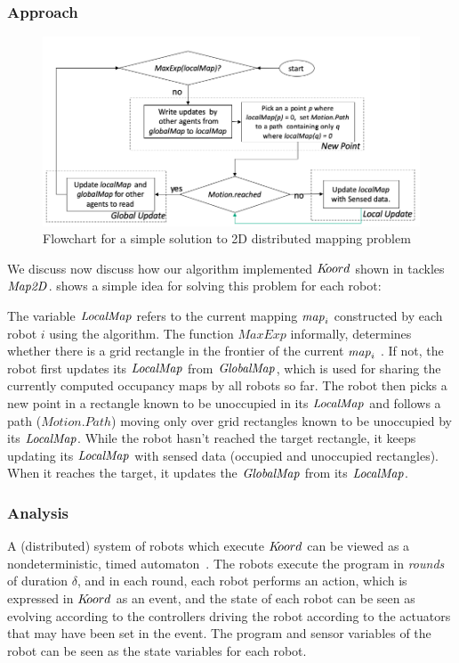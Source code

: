 \subsubsection{Approach}


\begin{figure}[!htbp]
    \centering
    \includegraphics[width=\linewidth]{figs/map_flowchart.png}
    \caption{Flowchart for a simple solution to 2D distributed mapping problem\vspace{-2mm}}
    \label{fig:flowmap}
\end{figure}



We discuss now discuss how our algorithm implemented $K\kern-2pt oord$ shown in  tackles $\mathit{Map2D}$.  shows a simple idea for solving this problem for each robot:

The variable $\mathit{LocalMap}$ refers to the current mapping $\mathit{map}_i$ constructed by each robot $i$ using the algorithm. The function $\mathit{MaxExp}$ informally, determines whether there is a grid rectangle in the frontier of the current $\mathit{map}_i$ . If not, the robot first updates its $\mathit{LocalMap}$ from $\mathit{GlobalMap}$, which is used for sharing the currently computed occupancy maps by all robots so far. The robot then picks a new point in a rectangle known to be unoccupied in its $\mathit{LocalMap}$ and follows a path ($\mathit{Motion.Path}$) moving only over grid rectangles known to be unoccupied by its $\mathit{LocalMap}$. While the robot hasn't reached the target rectangle, it keeps updating its $\mathit{LocalMap}$ with sensed data (occupied and unoccupied rectangles). When it reaches the target, it updates the $\mathit{GlobalMap}$ from its $\mathit{LocalMap}$.


\subsubsection{Analysis}
A (distributed) system of robots which execute $K\kern-2pt oord$ can be viewed as a nondeterministic, timed automaton~\cite{TIOAmon}. The robots execute the program in  \emph{rounds} of duration $\delta$, and in each round, each robot performs an action, which is expressed in $K\kern-2pt oord$ as an event, and the state of each robot can be seen as evolving according to the controllers driving the robot according to the actuators that may have been set in the event. The program and sensor variables of the robot can be seen as the state variables for each robot.


